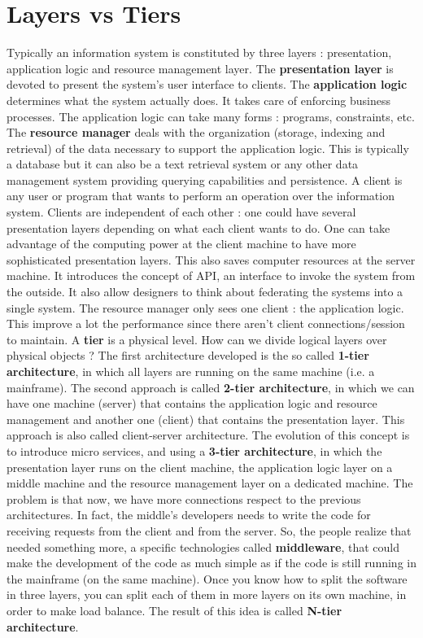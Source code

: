 \documentclass[11pt]{article}
\begin{document}
\section{Layers vs Tiers}
Typically an information system is constituted by three layers : presentation, application logic and resource management layer. The \textbf{presentation layer} is devoted to present the system's user interface to clients. The \textbf{application logic} determines what the system actually does. It takes care of enforcing business processes. The application logic can take many forms : programs, constraints, etc. The \textbf{resource manager} deals with the organization (storage, indexing and retrieval) of the data necessary to support the application logic. This is typically a database but it can also be a text retrieval system or any other data management system providing querying capabilities and persistence. A client is any user or program that wants to perform an operation over the information system. Clients are independent of each other : one could have several presentation layers depending on what each client wants to do. One can take advantage of the computing power at the client machine to have more sophisticated presentation layers. This also saves computer resources at the server machine. It introduces the concept of API, an interface to invoke the system from the outside. It also allow designers to think about federating the systems into a single system. The resource manager only sees one client : the application logic. This improve a lot the performance since there aren't client connections/session to maintain. A \textbf{tier} is a physical level. How can we divide logical layers over physical objects ? The first architecture developed is the so called \textbf{1-tier architecture}, in which all layers are running on the same machine (i.e. a mainframe). The second approach is called \textbf{2-tier architecture}, in which we can have one machine (server) that contains the application logic and resource management and another one (client) that contains the presentation layer. This approach is also called client-server architecture. The evolution of this concept is to introduce micro services, and using a \textbf{3-tier architecture}, in which the presentation layer runs on the client machine, the application logic layer on a middle machine and the resource management layer on a dedicated machine. The problem is that now, we have more connections respect to the previous architectures. In fact, the middle's developers needs to write the code for  receiving requests from the client and from the server. So, the people realize that needed something more, a specific technologies called \textbf{middleware}, that could make the development of the code as much simple as if the code is still running in the mainframe (on the same machine). Once you know how to split the software in three layers, you can split each of them in more layers on its own machine, in order to make load balance. The result of this idea is called \textbf{N-tier architecture}.
\end{document}
